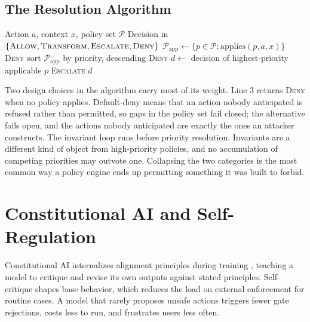 \documentclass[11pt]{book}
\begin{document}
\subsection{The Resolution Algorithm}

\begin{algorithm}
\caption{Priority-Ordered Conflict Resolution}
\begin{algorithmic}[1]
\Require Action $a$, context $x$, policy set $\mathcal{P}$
\Ensure Decision in $\{\textsc{Allow}, \textsc{Transform}, \textsc{Escalate}, \textsc{Deny}\}$
\State $\mathcal{P}_{\text{app}} \gets \{p \in \mathcal{P} : \text{applies}(p, a, x)\}$
    \State \Return \textsc{Deny} 
\EndIf
\State sort $\mathcal{P}_{\text{app}}$ by priority, descending
        \State \Return \textsc{Deny} 
    \EndIf
\EndFor
\State $d \gets$ decision of highest-priority applicable $p$
    \State \Return \textsc{Escalate}
\EndIf
\State \Return $d$
\end{algorithmic}
\end{algorithm}

Two design choices in the algorithm carry most of its weight. Line 3 returns \textsc{Deny} when no policy applies. Default-deny means that an action nobody anticipated is refused rather than permitted, so gaps in the policy set fail closed; the alternative fails open, and the actions nobody anticipated are exactly the ones an attacker constructs. The invariant loop runs before priority resolution. Invariants are a different kind of object from high-priority policies, and no accumulation of competing priorities may outvote one. Collapsing the two categories is the most common way a policy engine ends up permitting something it was built to forbid.

\section{Constitutional AI and Self-Regulation}

Constitutional AI internalizes alignment principles during training \cite{cai2022}, teaching a model to critique and revise its own outputs against stated principles. Self-critique shapes base behavior, which reduces the load on external enforcement for routine cases. A model that rarely proposes unsafe actions triggers fewer gate rejections, costs less to run, and frustrates users less often.
\end{document}
